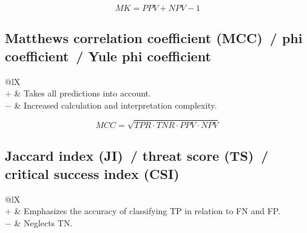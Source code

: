 \documentclass{article}
\begin{document}
\begin{equation}
    \textit{MK} = \textit{PPV} + \textit{NPV} - 1
%
    \label{equation:MK}
\end{equation}


\subsection[Matthews correlation coefficient (MCC)~/ phi coefficient~/ Yule phi coefficient]{Matthews correlation coefficient (MCC)~/ phi coefficient~/ Yule phi coefficient \cite{yule1912methods, matthews1975comparison, cramer1999mathematical, chicco2020advantages}}

\begin{table}[H]\centering
    \begin{tabularx}{\textwidth}{@{}lX}
         \\
        \textcolor{Green}{$+$} & Takes all predictions into account. \\
        \textcolor{Red}{$-$}   & Increased calculation and interpretation complexity.
    \end{tabularx}
\end{table}

\begin{equation}
    \textit{MCC} = \sqrt{\textit{TPR} \cdot \textit{TNR} \cdot \textit{PPV} \cdot \textit{NPV}}
%
    \label{equation:MCC}
\end{equation}


\subsection[Jaccard index (JI)~/ threat score (TS)~/ critical success index (CSI)]{Jaccard index (JI)~/ threat score (TS)~/ critical success index (CSI) \cite{jaccard1912distribution, murphy1996finley}}

\begin{table}[H]\centering
    \begin{tabularx}{\textwidth}{@{}lX}
         \\
        \textcolor{Green}{$+$} & Emphasizes the accuracy of classifying TP in relation to FN and FP. \\
        \textcolor{Red}{$-$}   & Neglects TN.
    \end{tabularx}
\end{table}
\end{document}
